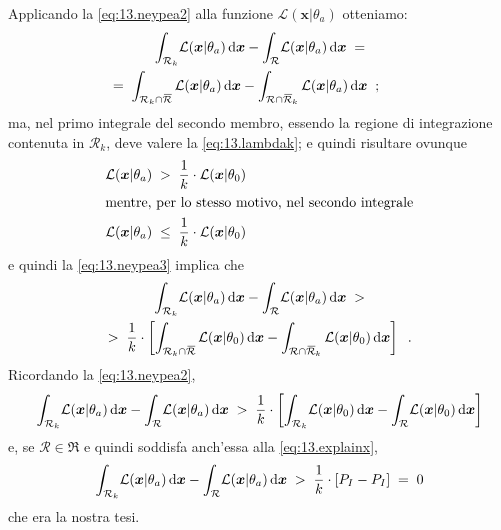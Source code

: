 \noindent Applicando la \eqref{eq:13.neypea2} alla funzione
$\mathcal{L}(\boldsymbol{x} | \theta_a)$ otteniamo:
\begin{multline} \label{eq:13.neypea3}
  \int_{\mathcal{R}_k} \! \mathcal{L}(\boldsymbol{x} |
    \theta_a) \, \de \boldsymbol{x} -\int_{\mathcal{R}} \!
    \mathcal{L}(\boldsymbol{x} | \theta_a) \, \de
    \boldsymbol{x} \; = \\
  = \; \int_{\mathcal{R}_k \cap \overbar{\mathcal{R}}}
    \mathcal{L}(\boldsymbol{x} | \theta_a) \, \de
    \boldsymbol{x} - \int_{\mathcal{R} \cap
    \overbar{\mathcal{R}}_k} \mathcal{L}(\boldsymbol{x}
    | \theta_a) \, \de \boldsymbol{x} \peq ; \qquad
\end{multline}
ma, nel primo integrale del secondo membro, essendo la
regione di integrazione contenuta in $\mathcal{R}_k$, deve
valere la \eqref{eq:13.lambdak}; e quindi risultare ovunque
\begin{gather*}
  \mathcal{L}(\boldsymbol{x} | \theta_a) \; > \; \frac{1}{k}
    \cdot \mathcal{L}(\boldsymbol{x} | \theta_0) \\
  \intertext{mentre, per lo stesso motivo, nel secondo
    integrale}
  \mathcal{L}(\boldsymbol{x} | \theta_a) \; \le \;
    \frac{1}{k} \cdot \mathcal{L}(\boldsymbol{x} | \theta_0)
\end{gather*}
e quindi la \eqref{eq:13.neypea3} implica che
\begin{multline*}
  \int_{\mathcal{R}_k} \! \mathcal{L}(\boldsymbol{x} |
    \theta_a) \, \de \boldsymbol{x} -\int_{\mathcal{R}} \!
    \mathcal{L}(\boldsymbol{x} | \theta_a) \, \de
    \boldsymbol{x} \; > \\
  > \; \frac{1}{k} \cdot \left[ \int_{\mathcal{R}_k \cap
    \overbar{\mathcal{R}}} \mathcal{L}(\boldsymbol{x} |
    \theta_0) \, \de \boldsymbol{x} - \int_{\mathcal{R}
    \cap \overbar{\mathcal{R}}_k}
    \mathcal{L}(\boldsymbol{x} | \theta_0) \, \de
    \boldsymbol{x} \right] \peq .
\end{multline*}
Ricordando la \eqref{eq:13.neypea2},
\begin{equation*}
  \int_{\mathcal{R}_k} \! \mathcal{L}(\boldsymbol{x} |
    \theta_a) \, \mathrm{d} \boldsymbol{x} -\int_{\mathcal{R}} \!
    \mathcal{L}(\boldsymbol{x} | \theta_a) \, \mathrm{d}
    \boldsymbol{x} \; > \; \frac{1}{k} \cdot \left[
    \int_{\mathcal{R}_k} \! \mathcal{L}(\boldsymbol{x} |
    \theta_0) \, \mathrm{d} \boldsymbol{x} -\int_{\mathcal{R}} \!
    \mathcal{L}(\boldsymbol{x} | \theta_0) \, \mathrm{d}
    \boldsymbol{x} \right]
\end{equation*}
e, se $\mathcal{R} \in \Re$ e quindi soddisfa anch'essa alla
\eqref{eq:13.explainx},
\begin{equation*}
  \int_{\mathcal{R}_k} \! \mathcal{L}(\boldsymbol{x} |
    \theta_a) \, \mathrm{d} \boldsymbol{x} -\int_{\mathcal{R}} \!
    \mathcal{L}(\boldsymbol{x} | \theta_a) \, \mathrm{d}
    \boldsymbol{x} \; > \; \frac{1}{k} \cdot \left[ P_I -
    P_I \right] \; = \; 0
\end{equation*}
che era la nostra tesi.%

